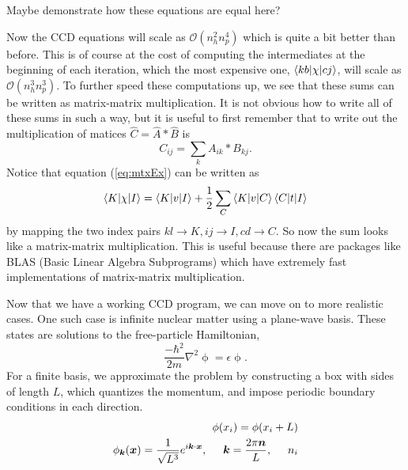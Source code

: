 Maybe demonstrate how these equations are equal here? 

Now the CCD equations will scale as $\mathcal{O}(n_{h}^{2} n_{p}^{4})$ which is quite a bit better than before. This is of course at the cost of computing the intermediates at the beginning of each iteration, which the most expensive one, $\braket{kb| \chi |cj}$, will scale as $\mathcal{O}(n_{h}^{3} n_{p}^{3})$. To further speed these computations up, we see that these sums can be written as matrix-matrix multiplication. It is not obvious how to write all of these sums in such a way, but it is useful to first remember that to write out the multiplication of matices $\hat{C} = \hat{A} * \hat{B}$ is
\begin{equation}
C_{ij} = \sum_{k} A_{ik} * B_{kj}.
\end{equation}
Notice that equation (\ref{eq:mtxEx}) can be written as
\[
\braket{K| \chi |I} = \braket{K|v|I} + \frac{1}{2} \sum_{C} \braket{K|v|C} \braket{C|t|I} 
\]
by mapping the two index pairs $kl \to K, ij \to I, cd \to C$. So now the sum looks like a matrix-matrix multiplication. This is useful because there are packages like BLAS (Basic Linear Algebra Subprograms) which have extremely fast implementations of matrix-matrix multiplication.

Now that we have a working CCD program, we can move on to more realistic cases. One such case is infinite nuclear matter using a plane-wave basis. These states are solutions to the free-particle Hamiltonian,
\begin{equation}
\frac{-\hbar^2}{2m}\nabla^2\mathop{\phi(\vec{x})}=\epsilon\mathop{\phi(\vec{x})}.
\end{equation}
For a finite basis, we approximate the problem by constructing a box with sides of length $L$, which quantizes the momentum, and impose periodic boundary conditions in each direction.
\begin{align}
\mathop{\phi(x_{i})}=\mathop{\phi(x_{i}+L)} \\
\mathop{\phi_{\vec{k}}(\vec{x})}=\frac{1}{\sqrt{L^{3}}}e^{i\vec{k}\cdot\vec{x}},\hspace{0.5cm}\vec{k}=\frac{2\pi\vec{n}}{L},\hspace{0.5cm}n_{i}
\end{align}

